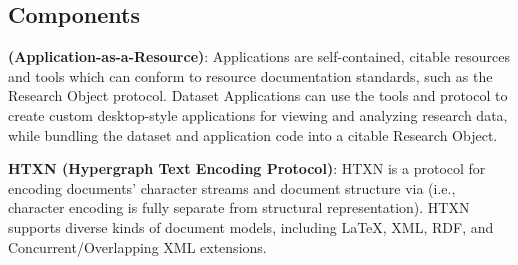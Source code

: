 \atsp
\begin{frame}{}
\section{Components}

\vspace*{33pt}
{\thrulexrev}
\vspace*{-15pt}

{\fontsize{18}{22}\selectfont
\hspace*{25pt}\begin{minipage}{1.2\textwidth}
\vspace{12pt}



		

{\setlength{\leftmargini}{9pt}\begin{enumerate}
\setlength{\labelsep}{13pt}
\dmitem \textbf{\AtR{} (Application-as-a-Resource)}: \hspace{.25em} 
\AtR{} Applications are self-contained, citable resources and tools which 
can conform to  resource documentation standards, such as the Research Object protocol.  Dataset Applications can use the \AtR{} tools 
and protocol to create custom desktop-style applications 
for viewing and analyzing research data, while bundling the dataset  and application code into a citable Research Object. 
\vspace{19pt}

\dmitem \textbf{HTXN (Hypergraph Text Encoding Protocol)}:  \hspace{.25em}
HTXN is a protocol for encoding documents' character streams  
and document structure via  (i.e.,  
character encoding is fully separate from structural representation).  
HTXN supports diverse kinds of document models, including 
\LaTeX{}, XML, RDF, and Concurrent/Overlapping XML extensions. 
\vspace{19pt}


\end{enumerate}}
\end{minipage}}
\end{frame}
